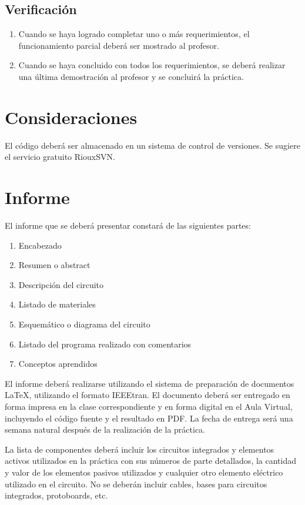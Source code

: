 \documentclass[12pt,letterpaper]{IEEEtran}
\begin{document}
\subsection{Verificación}

\begin{enumerate}[resume]
	\item Cuando se haya logrado completar uno o más requerimientos, el funcionamiento parcial deberá ser mostrado al profesor.
	\item Cuando se haya concluido con todos los requerimientos, se deberá realizar una última demostración al profesor y se concluirá la práctica.
\end{enumerate}

\section{Consideraciones}

El código deberá ser almacenado en un sistema de control de versiones. Se sugiere el servicio gratuito RiouxSVN. 

\section{Informe}

El informe que se deberá presentar constará de las siguientes partes:

\begin{enumerate}
  \item Encabezado
  \item Resumen o abstract
  \item Descripción del circuito
  \item Listado de materiales
  \item Esquemático o diagrama del circuito
  \item Listado del programa realizado con comentarios
  \item Conceptos aprendidos
\end{enumerate}

El informe deberá realizarse utilizando el sistema de preparación de documentos \LaTeX, utilizando el formato IEEEtran. El documento deberá ser entregado en forma impresa en la clase correspondiente y en forma digital en el Aula Virtual, incluyendo el código fuente y el resultado en PDF.  La fecha de entrega será una semana natural después de la realización de la práctica.

La lista de componentes deberá incluir los circuitos integrados y elementos activos utilizados en la práctica con sus números de parte detallados, la cantidad y valor de los elementos pasivos utilizados y cualquier otro elemento eléctrico utilizado en el circuito. No se deberán incluir cables, bases para circuitos integrados, protoboards, etc.
\end{document}
